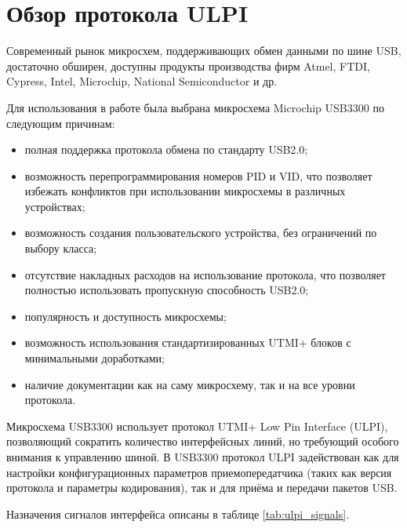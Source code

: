 \pagebreak

\section{Обзор протокола ULPI}

Современный рынок микросхем, поддерживающих обмен данными по шине USB, достаточно обширен, доступны продукты производства фирм Atmel, FTDI, Cypress, Intel, Microchip, National Semiconductor и др.

Для использования в работе была выбрана микросхема Microchip USB3300 по следующим причинам:

\begin{itemize}
\item полная поддержка протокола обмена по стандарту USB2.0;
\item возможность перепрограммирования номеров PID и VID, что позволяет избежать конфликтов при использовании микросхемы в различных устройствах;
\item возможность создания пользовательского устройства, без ограничений по выбору класса;
\item отсутствие накладных расходов на использование протокола, что позволяет полностью использовать пропускную способность USB2.0;
\item популярность и доступность микросхемы;
\item возможность использования стандартизированных UTMI+ блоков с минимальными доработками;
\item наличие документации как на саму микросхему, так и на все уровни протокола.
\end{itemize}

Микросхема USB3300 использует протокол UTMI+ Low Pin Interface (ULPI), позволяющий сократить количество интерфейсных линий, но требующий особого внимания к управлению шиной. В USB3300 протокол ULPI задействован как для настройки конфигурационных параметров приемопередатчика (таких как версия протокола и параметры кодирования), так и для приёма и передачи пакетов USB.

Назначения сигналов интерфейса описаны в таблице \ref{tab:ulpi_signals}.


